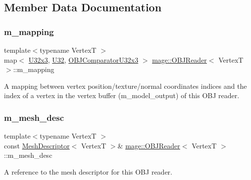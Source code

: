 \subsection{Member Data Documentation}
\hypertarget{classmage_1_1_o_b_j_reader_a7e78047c21fac9725df68f1591957c92}{}\label{classmage_1_1_o_b_j_reader_a7e78047c21fac9725df68f1591957c92} 
\subsubsection{\texorpdfstring{m\+\_\+mapping}{m\_mapping}}
{\footnotesize\ttfamily template$<$typename VertexT $>$ \\
map$<$ \hyperlink{namespacemage_ab3633c193f686845fcf80ce95d18a20b}{U32x3}, \hyperlink{namespacemage_a41c104c036fba3756a74e19f793eeaa1}{U32}, \hyperlink{structmage_1_1_o_b_j_reader_1_1_o_b_j_comparator_u32x3}{O\+B\+J\+Comparator\+U32x3} $>$ \hyperlink{classmage_1_1_o_b_j_reader}{mage\+::\+O\+B\+J\+Reader}$<$ VertexT $>$\+::m\+\_\+mapping\hspace{0.3cm}{\ttfamily [private]}}

A mapping between vertex position/texture/normal coordinates\textquotesingle{} indices and the index of a vertex in the vertex buffer ({\ttfamily m\+\_\+model\+\_\+output}) of this O\+BJ reader. \hypertarget{classmage_1_1_o_b_j_reader_a3395a44a17a5749a332751465cece640}{}\label{classmage_1_1_o_b_j_reader_a3395a44a17a5749a332751465cece640} 
\subsubsection{\texorpdfstring{m\+\_\+mesh\+\_\+desc}{m\_mesh\_desc}}
{\footnotesize\ttfamily template$<$typename VertexT $>$ \\
const \hyperlink{structmage_1_1_mesh_descriptor}{Mesh\+Descriptor}$<$ VertexT $>$\& \hyperlink{classmage_1_1_o_b_j_reader}{mage\+::\+O\+B\+J\+Reader}$<$ VertexT $>$\+::m\+\_\+mesh\+\_\+desc\hspace{0.3cm}{\ttfamily [private]}}

A reference to the mesh descriptor for this O\+BJ reader. \hypertarget{classmage_1_1_o_b_j_reader_ad4691c59a3e3ecefd201a8f03528bbd8}{}\label{classmage_1_1_o_b_j_reader_ad4691c59a3e3ecefd201a8f03528bbd8} 
